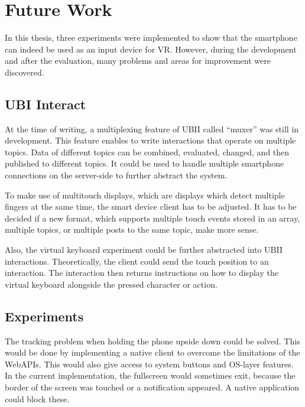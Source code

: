 \chapter{Future Work}\label{chapter:future-work}

In this thesis, three experiments were implemented to show that the smartphone can indeed be used as an input device for \ac{VR}. However, during the development and after the evaluation, many problems and areas for improvement were discovered. 



\section{UBI Interact}\label{section:fw-ubii}

At the time of writing, a multiplexing feature of \ac{UBII} called \enquote{muxer} was still in development. This feature enables to write interactions that operate on multiple topics. Data of different topics can be combined, evaluated, changed, and then published to different topics. It could be used to handle multiple smartphone connections on the server-side to further abstract the system.

To make use of multitouch displays, which are displays which detect multiple fingers at the same time, the smart device client has to be adjusted. It has to be decided if a new format, which supports multiple touch events stored in an array, multiple topics, or multiple posts to the same topic, make more sense.

Also, the virtual keyboard experiment could be further abstracted into \ac{UBII} interactions. Theoretically, the client could send the touch position to an interaction. The interaction then returns instructions on how to display the virtual keyboard alongside the pressed character or action.



\section{Experiments}\label{section:fw-experiments}

The tracking problem when holding the phone upside down could be solved. This would be done by implementing a native client to overcome the limitations of the WebAPIs. This would also give access to system buttons and \ac{OS}-layer features. In the current implementation, the fullscreen would sometimes exit, because the border of the screen was touched or a notification appeared. A native application could block these.

